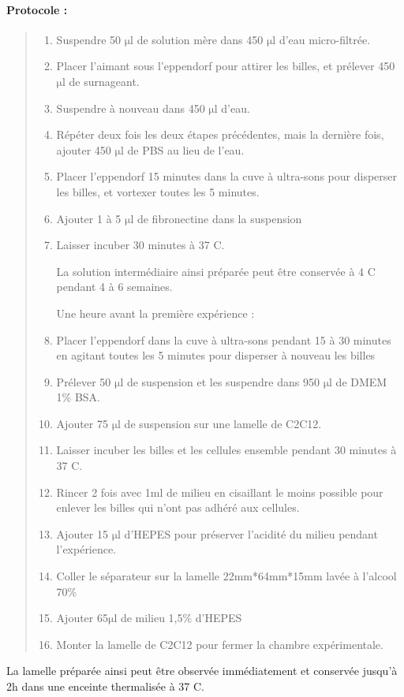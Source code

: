 \documentclass{report}
\newcommand{\micro}{$\mathrm{\mu}$}
\begin{document}
	\paragraph{Protocole : }
	\begin{quote}
	\begin{enumerate}
	\item Suspendre 50 \micro l de solution mère dans 450  \micro l d'eau micro-filtrée. 
	\item Placer l'aimant sous l'eppendorf pour attirer les billes, et prélever 450 \micro l de surnageant.
	\item Suspendre à nouveau dans 450 \micro l d'eau.
	\item Répéter deux fois les deux étapes précédentes, mais la dernière fois, ajouter 450 \micro l de PBS au lieu de l'eau. 
	\item Placer l'eppendorf 15 minutes dans la cuve à ultra-sons pour disperser les billes, et vortexer toutes les 5 minutes.
	\item Ajouter 1 à 5 \micro l de fibronectine dans la suspension
	\item Laisser incuber 30 minutes à 37 \degres C. 

La solution intermédiaire ainsi préparée peut être conservée à 4 \degres C pendant 4 à 6 semaines. 

Une heure avant la première expérience : 
	\item Placer l'eppendorf dans la cuve à ultra-sons pendant 15 à 30 minutes en agitant toutes les 5 minutes pour disperser à nouveau les billes
	\item Prélever 50 \micro l de suspension et les suspendre dans 950 \micro l de DMEM 1\% BSA. 
	\item Ajouter 75 \micro l de suspension sur une lamelle de C2C12.
	\item Laisser incuber les billes et les cellules ensemble pendant 30 minutes à 37 \degres C. 
	\item Rincer 2 fois avec 1ml de milieu en cisaillant le moins possible pour enlever les billes qui n'ont pas adhéré aux cellules. 
	\item Ajouter 15 \micro l d'HEPES pour préserver l'acidité du milieu pendant l'expérience.
	\item Coller le séparateur sur la lamelle 22mm*64mm*15mm lavée à l'alcool 70\%
	\item Ajouter 65\micro l de milieu 1,5\% d'HEPES
	\item Monter la lamelle de C2C12 pour fermer la chambre expérimentale.  
 
	\end{enumerate}
	\end{quote}
La lamelle préparée ainsi peut être observée immédiatement et conservée jusqu'à 2h dans une enceinte thermalisée à 37 \degres C. 	 	
	
\end{document}
